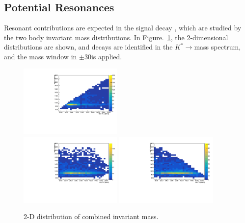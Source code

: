 \subsection{Potential Resonances}

Resonant contributions are expected in the signal decay \LbLckkpi, 
which are studied by the two body invariant mass distributions. 
In Figure.~\ref{fig:KpPi}, 
the 2-dimensional distributions are shown, 
and \Kp\pim decays are identified in the $K^{*}\to$\Kp\pim mass spectrum, 
and the \Lb mass window in $\pm30$\mev is applied.

\begin{figure}[!bth]
\centering
\includegraphics[width=0.45\textwidth]{Figures/05_open_charm/02_selection/kkpi_kpi.pdf} \\
\includegraphics[width=0.45\textwidth]{Figures/05_open_charm/02_selection/lckp_kpi.pdf}%
\includegraphics[width=0.45\textwidth]{Figures/05_open_charm/02_selection/lckm_kpi.pdf}%
\caption{2-D distribution of combined invariant mass.}
\label{fig:KpPi}
\end{figure}





